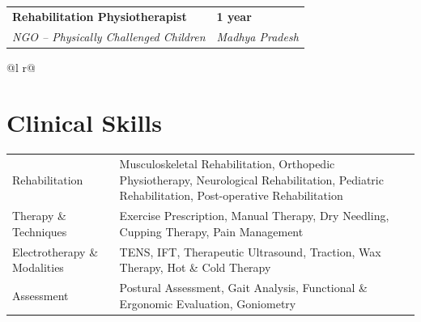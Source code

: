 \documentclass[a4paper,10pt]{article}
\makeatletter
\newcommand{\customHeading}[1]{
    \section{\texorpdfstring{#1 \hrulefill}{}}
}
\newcommand{\customSubHeading}[4]{
    \begin{tabularx}{1.0\textwidth}{
           @{} >{\raggedright\arraybackslash}X >{\raggedleft\arraybackslash}X @{} }
          \textbf{#1} & \textbf{#4} \\[1.0pt]
          \textit{#2} & \textit{#3} \\[2.0pt]
    \end{tabularx}
}
\makeatother
\begin{document}
\customSubHeading{Rehabilitation Physiotherapist}
{NGO -- Physically Challenged Children}
{Madhya Pradesh}{1 year}
\begin{tabularx}{\linewidth}{ @{}l r@{} }
\end{tabularx}


\customHeading{Clinical Skills}
\begin{tabularx}{\linewidth}{@{}l X@{}}
Rehabilitation  &  \normalsize{Musculoskeletal Rehabilitation, Orthopedic Physiotherapy, Neurological Rehabilitation, Pediatric Rehabilitation, Post-operative Rehabilitation}\\

Therapy \& Techniques  &  \normalsize{Exercise Prescription, Manual Therapy, Dry Needling, Cupping Therapy, Pain Management}\\

Electrotherapy \& Modalities  &  \normalsize{TENS, IFT, Therapeutic Ultrasound, Traction, Wax Therapy, Hot \& Cold Therapy}\\

Assessment  &  \normalsize{Postural Assessment, Gait Analysis, Functional \& Ergonomic Evaluation, Goniometry}\\
\end{tabularx}
\end{document}
